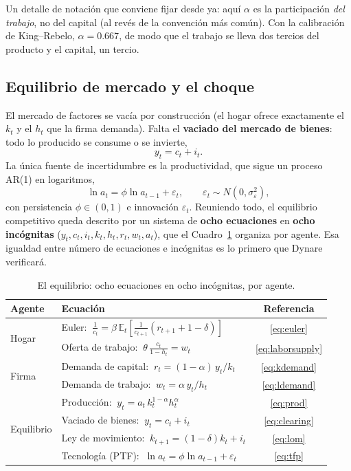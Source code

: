 \documentclass[11pt,a4paper]{report}
\newcounter{tcbrem}[section]
\renewcommand{\thetcbrem}{\thesection.\arabic{tcbrem}}
\newenvironment{remark}{%
  \refstepcounter{tcbrem}%
  \begin{tcolorbox}[remarkstyle, title={Observación~\thetcbrem}]}%
{\end{tcolorbox}}
\newcommand{\E}{\mathbb{E}}
\begin{document}
\begin{remark}
Un detalle de notación que conviene fijar desde ya: aquí $\alpha$ es la participación
\emph{del trabajo}, no del capital (al revés de la convención más común). Con la
calibración de King--Rebelo, $\alpha=0.667$, de modo que el trabajo se lleva dos
tercios del producto y el capital, un tercio.
\end{remark}

\subsection{Equilibrio de mercado y el choque}
\label{sec:equilibrio}

El mercado de factores se vacía por construcción (el hogar ofrece exactamente el $k_t$
y el $h_t$ que la firma demanda). Falta el \textbf{vaciado del mercado de bienes}: todo
lo producido se consume o se invierte,
\begin{equation}
y_t=c_t+i_t. \label{eq:clearing}
\end{equation}
La única fuente de incertidumbre es la productividad, que sigue un proceso AR(1) en
logaritmos,
\begin{equation}
\ln a_t = \phi \ln a_{t-1} + \varepsilon_t,
\qquad \varepsilon_t\sim N(0,\sigma_\varepsilon^2),
\label{eq:tfp}
\end{equation}
con persistencia $\phi\in(0,1)$ e innovación $\varepsilon_t$. Reuniendo todo, el
equilibrio competitivo queda descrito por un sistema de \textbf{ocho ecuaciones} en
\textbf{ocho incógnitas} ($y_t,c_t,i_t,k_t,h_t,r_t,w_t,a_t$), que el
Cuadro~\ref{tab:system} organiza por agente. Esa igualdad entre número de ecuaciones e
incógnitas es lo primero que Dynare verificará.

\begin{table}[H]
\centering\small
\begin{tabular}{llc}
\toprule
\textbf{Agente} & \textbf{Ecuación} & \textbf{Referencia}\\
\midrule
\multirow{2}{*}{Hogar}
  & Euler: $\ \frac{1}{c_t}=\beta\,\E_t[\frac{1}{c_{t+1}}(r_{t+1}+1-\delta)]$ & \eqref{eq:euler}\\[2pt]
  & Oferta de trabajo: $\ \theta\,\frac{c_t}{1-h_t}=w_t$ & \eqref{eq:laborsupply}\\
\midrule
\multirow{2}{*}{Firma}
  & Demanda de capital: $\ r_t=(1-\alpha)\,y_t/k_t$ & \eqref{eq:kdemand}\\[2pt]
  & Demanda de trabajo: $\ w_t=\alpha\,y_t/h_t$ & \eqref{eq:ldemand}\\
\midrule
\multirow{4}{*}{Equilibrio}
  & Producción: $\ y_t=a_t\,k_t^{1-\alpha}h_t^{\alpha}$ & \eqref{eq:prod}\\[2pt]
  & Vaciado de bienes: $\ y_t=c_t+i_t$ & \eqref{eq:clearing}\\[2pt]
  & Ley de movimiento: $\ k_{t+1}=(1-\delta)k_t+i_t$ & \eqref{eq:lom}\\[2pt]
  & Tecnología (PTF): $\ \ln a_t=\phi\ln a_{t-1}+\varepsilon_t$ & \eqref{eq:tfp}\\
\bottomrule
\end{tabular}
\caption{El equilibrio: ocho ecuaciones en ocho incógnitas, por agente.}
\label{tab:system}
\end{table}
\end{document}
